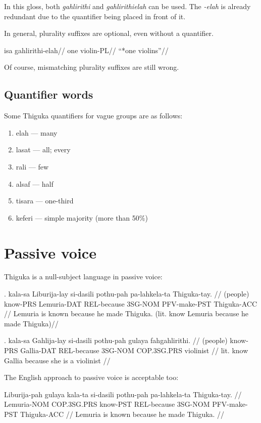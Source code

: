 In this gloss, both \textit{gahlirithi} and \textit{gahlirithielah} can be used.
The \textit{-elah} is already redundant due to the quantifier being placed in front of it.

In general, plurality suffixes are optional, even without a quantifier.

\ex
\begingl
    \gla  isa  gahlirithi-elah//
    \glb  one  violin-PL//
    \glft ``*one violins''//
\endgl
\xe

Of course, mismatching plurality suffixes are still wrong.

\subsection*{Quantifier words}

Some Thiguka quantifiers for vague groups are as follows:
\begin{enumerate}
    \item elah --- many
    \item lasat --- all; every
    \item rali --- few
    \item alsaf --- half
    \item tisara --- one-third
    \item keferi --- simple majority (more than 50\%{})
\end{enumerate}

\section{Passive voice}
Thiguka is a null-subject language in passive voice:

\ex
\begingl
\gla  .        kala-sa  Liburija-lay si-dasili   pothu-pah pa-lahkela-ta Thiguka-tay. //
\glb  (people) know-PRS Lemuria-DAT  REL-because 3SG-NOM   PFV-make-PST  Thiguka-ACC //
\glft Lemuria is known because he made Thiguka. (lit. know Lemuria because he made Thiguka)//
\endgl
\xe

\ex
\begingl
\gla  .        kala-sa  Gahlija-lay si-dasili   pothu-pah gulaya      fahgahlirithi. //
\glb  (people) know-PRS Gallia-DAT  REL-because 3SG-NOM   COP.3SG.PRS violinist //
\glft lit. know Gallia because she is a violinist //
\endgl
\xe

The English approach to passive voice is acceptable too:

\ex
\begingl
\gla Liburija-pah gulaya      kala-ta  si-dasili pothu-pah pa-lahkela-ta Thiguka-tay. //
\glb Lemuria-NOM  COP.3SG.PRS know-PST REL-because 3SG-NOM PFV-make-PST  Thiguka-ACC  //
\glft Lemuria is known because he made Thiguka. //
\endgl
\xe 

